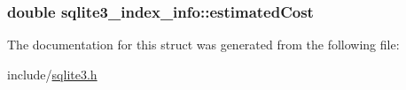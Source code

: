 \hypertarget{structsqlite3__index__info_a8b4fe1d2ee38aab57ba5e1da00d7830}{
\subsubsection[estimatedCost]{\setlength{\rightskip}{0pt plus 5cm}double {\bf sqlite3\_\-index\_\-info::estimatedCost}}}
\label{structsqlite3__index__info_a8b4fe1d2ee38aab57ba5e1da00d7830}




The documentation for this struct was generated from the following file:\begin{CompactItemize}
\item 
include/\hyperlink{sqlite3_8h}{sqlite3.h}\end{CompactItemize}
